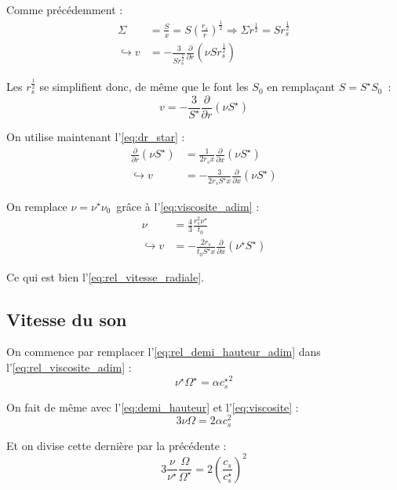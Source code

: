 Comme précédemment :
\begin{align}
    \Sigma &= \frac{S}{x} = S \left( \frac{r_s}{r} \right)^\frac{1}{2} \Rightarrow \Sigma r^\frac{1}{2} = S r_s^\frac{1}{2} \\
    \hookrightarrow v &= - \frac{3}{S r_s^\frac{1}{2}} \frac{\partial}{\partial r} \left(\nu S r_s^\frac{1}{2} \right)
\end{align}

Les $r_s^\frac{1}{2}$ se simplifient donc, de même que le font les $S_0$ en remplaçant $S = S^\star S_0$ :
\begin{equation}
    v = - \frac{3}{S^\star} \frac{\partial}{\partial r} \left(\nu S^\star \right)
\end{equation}

On utilise maintenant l’\cref{eq:dr_star} :
\begin{align}
    \frac{\partial}{\partial r} \left(\nu S^\star \right) &= \frac{1}{2 r_s x} \frac{\partial}{\partial x} \left( \nu S^\star \right) \\
    \hookrightarrow v &= - \frac{3}{2 r_s S^\star x} \frac{\partial}{\partial x} \left(\nu S^\star \right)
\end{align}

On remplace $\nu = \nu^\star \nu_0$ grâce à l’\cref{eq:viscosite_adim} :
\begin{align}
    \nu &= \frac{4}{3} \frac{r_s^2 \nu^\star}{t_0} \\
    \hookrightarrow v &= - \frac{2 r_s}{t_0 S^\star x} \frac{\partial}{\partial x} \left(\nu^\star S^\star \right)
\end{align}

Ce qui est bien l’\cref{eq:rel_vitesse_radiale}.

\subsection{Vitesse du son}

On commence par remplacer l’\cref{eq:rel_demi_hauteur_adim} dans l’\cref{eq:rel_viscosite_adim} :
\begin{equation}
    \nu^\star \Omega^\star = \alpha {c_s^\star}^2
\end{equation}

On fait de même avec l’\cref{eq:demi_hauteur} et l’\cref{eq:viscosite} :
\begin{equation}
    3 \nu \Omega = 2 \alpha c_s^2
\end{equation}

Et on divise cette dernière par la précédente :
\begin{equation}
    3 \frac{\nu}{\nu^\star} \frac{\Omega}{\Omega^\star} = 2 \left(\frac{c_s}{c_s^\star}\right)^2
\end{equation}

